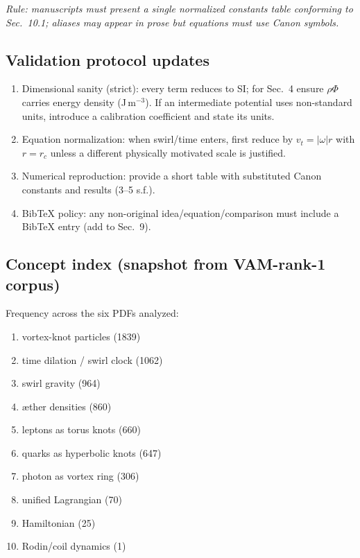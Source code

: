 \documentclass[11pt, a4paper]{article}
\begin{document}
\textit{Rule: manuscripts must present a single normalized constants table conforming to Sec.~10.1; aliases may appear in prose but equations must use Canon symbols.}

\subsection*{ Validation protocol updates}

\begin{enumerate}
    \item Dimensional sanity (strict): every term reduces to SI; for Sec.~4 ensure $\rho \Phi$ carries energy density (J\,m$^{-3}$). If an intermediate potential uses non-standard units, introduce a calibration coefficient and state its units.
    \item Equation normalization: when swirl/time enters, first reduce by $v_t = |\omega| r$ with $r = r_c$ unless a different physically motivated scale is justified.
    \item Numerical reproduction: provide a short table with substituted Canon constants and results (3--5 s.f.).
    \item BibTeX policy: any non-original idea/equation/comparison must include a BibTeX entry (add to Sec.~9).
\end{enumerate}

\subsection*{Concept index (snapshot from VAM-rank-1 corpus)}

Frequency across the six PDFs analyzed:

\begin{enumerate}
    \item vortex-knot particles (1839)
    \item time dilation / swirl clock (1062)
    \item swirl gravity (964)
    \item æther densities (860)
    \item leptons as torus knots (660)
    \item quarks as hyperbolic knots (647)
    \item photon as vortex ring (306)
    \item unified Lagrangian (70)
    \item Hamiltonian (25)
    \item Rodin/coil dynamics (1)
\end{enumerate}
\end{document}
